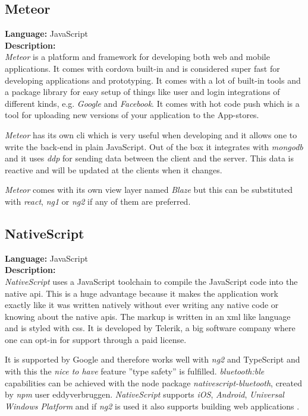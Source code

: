 \subsection*{Meteor}
\textbf{Language:} JavaScript
\\
\textbf{Description:}
\\
\textit{Meteor} is a platform and framework for developing both web and mobile applications. 
It comes with \gls{cordova} built-in and is considered super fast for developing applications and prototyping. 
It comes with a lot of built-in tools and a package library for easy setup of things like user  and login integrations of different kinds, e.g. \textit{Google} and \textit{Facebook}. It comes with hot code push which is a tool for uploading new versions of your application to the App-stores.

\textit{Meteor} has its own \gls{cli} which is very useful when developing and it allows one to write the back-end in plain JavaScript. 
Out of the box it integrates with \textit{\gls{mongodb}} and it uses \textit{\gls{ddp}} for sending data between the client and the server. 
This data is reactive and will be updated at the clients when it changes.

\textit{Meteor} comes with its own view layer named \textit{Blaze} but this can be substituted with \textit{\gls{react}}, \textit{\gls{ng1}} or \textit{\gls{ng2}} if any of them are preferred.

\subsection*{NativeScript}
\textbf{Language:} JavaScript
\\
\textbf{Description:}
\\
\textit{NativeScript} uses a JavaScript toolchain to compile the JavaScript code into the native \gls{api}. 
This is a huge advantage because it makes the application work exactly like it was written natively without ever writing any native code or knowing about the native \glspl{api}. 
The markup is written in an \gls{xml} like language and is styled with \gls{css}.
It is developed by Telerik, a big software company where one can opt-in for support through a paid license. 

It is supported by Google and therefore works well with \textit{\gls{ng2}} and TypeScript and with this the \textit{nice to have} feature ''type safety'' is fulfilled. 
\textit{\gls{bluetooth:ble}} capabilities can be achieved with the \gls{node} package \textit{nativescript-bluetooth}, created by \textit{npm} user eddyverbruggen. 
\textit{NativeScript} supports \textit{iOS}, \textit{Android}, \textit{Universal Windows Platform} and if \textit{\gls{ng2}} is used it also supports building web applications \citep{preStudy:frameworks:nativescript}.


